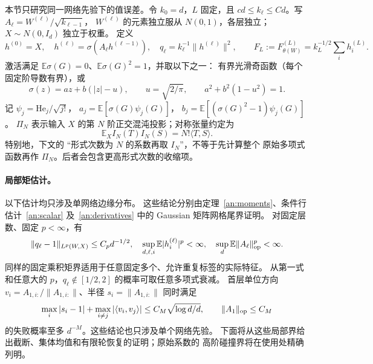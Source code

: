 \documentclass[a4paper]{tufte-handout}
\begin{document}
\begin{fullwidth}
本节只研究同一网络先验下的值误差。令 $k_0=d$，$L$ 固定，且
$c d\leq k_\ell\leq C d$。写 $A_\ell=W^{(\ell)}/\sqrt{k_{\ell-1}}$，
$W^{(\ell)}$ 的元素独立服从 $N(0,1)$，各层独立；$X\sim N(0,I_d)$ 独立于权重。
定义
\[
 h^{(0)}=X,\quad h^{(\ell)}=\sigma(A_\ell h^{(\ell-1)}),\quad
 q_\ell=k_\ell^{-1}\|h^{(\ell)}\|^2,\qquad
 F_L:=F_{\theta(W)}^{(L)}=k_L^{-1/2}\sum_i h_i^{(L)}.
\]
激活满足 $\mathbb E\sigma(G)=0$、$\mathbb E\sigma(G)^2=1$，并取以下之一：
有界光滑奇函数（每个固定阶导数有界），或
\begin{equation}\label{fp:actual-pl}
 \sigma(z)=a z+b(|z|-u),\qquad u=\sqrt{2/\pi},\qquad
 a^2+b^2(1-u^2)=1.
\end{equation}
记 $\psi_j=\mathrm{He}_j/\sqrt{j!}$，
$a_j=\mathbb E[\sigma(G)\psi_j(G)]$，
$b_j=\mathbb E[(\sigma(G)^2-1)\psi_j(G)]$。
$\Pi_N$ 表示输入 $X$ 的第 $N$ 阶正交混沌投影；对称张量约定为
\begin{equation}\label{fp:actual-isometry}
 \mathbb E_X I_N(T)I_N(S)=N!\langle T,S\rangle.
\end{equation}
特别地，下文的 ``形式次数为 $N$ 的系数再取 $I_N$''，不等于先计算整个
原始多项式函数再作 $\Pi_N$。后者会包含更高形式次数的收缩项。

\paragraph{局部矩估计。}
以下估计均只涉及单网络边缘分布。
这些结论分别由定理~\ref{an:moments}、条件行估计~\ref{an:scalar}
及~\ref{an:derivatives} 中的 Gaussian 矩阵网格尾界证明。
对固定层数、固定 $p<\infty$，有
\begin{equation}\label{fp:actual-local-interface}
 \|q_\ell-1\|_{L^p(W,X)}\leq C_p d^{-1/2},\quad
 \sup_{d,\ell,i}\mathbb E|h_i^{(\ell)}|^p<\infty,\quad
 \sup_d\mathbb E\|A_\ell\|_{\rm op}^p<\infty.
\end{equation}
同样的固定乘积矩界适用于任意固定多个、允许重复标签的实际特征。
从第一式和任意大的 $p$，$q_\ell\notin[1/2,2]$ 的概率可取任意多项式衰减。
首层单位方向 $v_i=A_{1,i:}/\|A_{1,i:}\|$、半径 $s_i=\|A_{1,i:}\|$
同时满足
\begin{equation}\label{fp:actual-row-event}
 \max_i|s_i-1|+\max_{i\ne j}|\langle v_i,v_j\rangle|
 \leq C_M\sqrt{\log d/d},\qquad \|A_1\|_{\rm op}\leq C_M
\end{equation}
的失败概率至多 $d^{-M}$。这些结论也只涉及单个网络先验。
下面将从这些局部界给出截断、集体均值和有限轮恢复的证明；原始系数的
高阶碰撞界将在使用处精确列明。


\end{fullwidth}
\end{document}
